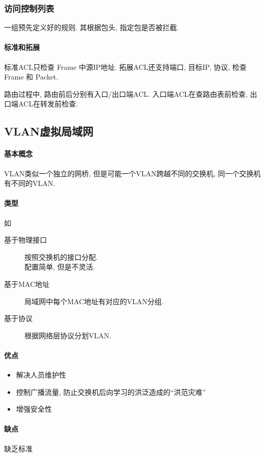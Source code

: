 \documentclass{ctexart}
\begin{document}
\subsubsection{访问控制列表} 一组预先定义好的规则. 其根据包头, 指定包是否被拦截.
\paragraph{标准和拓展} 标准ACL只检查 Frame 中源IP地址.
    拓展ACL还支持端口, 目标IP, 协议, 检查 Frame 和 Packet.\par
    路由过程中, 路由前后分别有入口/出口端ACL. 入口端ACL在查路由表前检查, 出口端ACL在转发前检查.

\subsection{VLAN虚拟局域网}
\paragraph{基本概念} VLAN类似一个独立的网桥, 但是可能一个VLAN跨越不同的交换机, 同一个交换机有不同的VLAN.
\paragraph{类型} 如 \begin{description}
        \item[基于物理接口] 按照交换机的接口分配.\\ 配置简单, 但是不灵活.
        \item[基于MAC地址] 局域网中每个MAC地址有对应的VLAN分组.
        \item[基于协议] 根据网络层协议分划VLAN.
    \end{description}
\paragraph{优点} \begin{itemize}
        \item 解决人员维护性
        \item 控制广播流量, 防止交换机后向学习的洪泛造成的``洪范灾难''
        \item 增强安全性
    \end{itemize}
\paragraph{缺点} 缺乏标准

\end{document}
